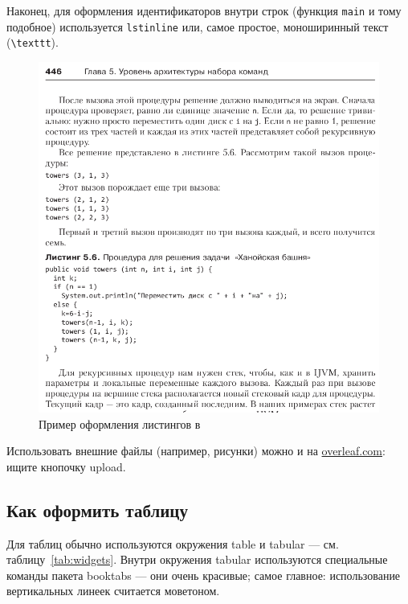 Наконец, для оформления идентификаторов внутри строк
(функция \lstinline{main} и тому подобное) используется
\texttt{lstinline} или, самое простое, моноширинный текст
(\texttt{\textbackslash texttt}).

\begin{figure}[p]%
\centering
\includegraphics[width=\textwidth]{img/tan-aus.png}
\caption{\label{fig:tan-aus}Пример оформления листингов в~\autocite{TanAus2013}}
\end{figure}

Использовать внешние файлы (например, рисунки) можно и на \href{http://overleaf.com}{overleaf.com}: ищите кнопочку upload.

\subsection{Как оформить таблицу}

Для таблиц обычно используются окружения table и tabular --- см. таблицу~\ref{tab:widgets}. Внутри окружения tabular используются специальные команды пакета booktabs — они очень красивые; самое главное: использование вертикальных линеек считается моветоном.

